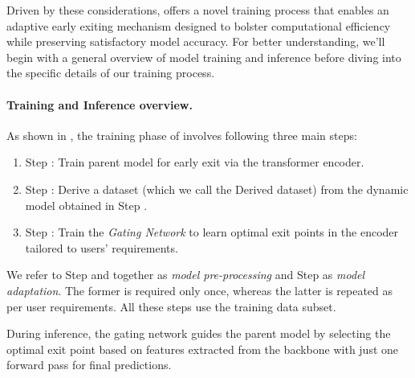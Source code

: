 Driven by these considerations, {\ours} offers a novel training process that enables an adaptive early exiting mechanism designed to bolster computational efficiency while preserving satisfactory model accuracy. For better understanding, we'll begin with a general overview of model training and inference before diving into the specific details of our training process. 
%

\paragraph{Training and Inference overview.} As shown in , the training phase of {\ours} involves following three main steps: 
\begin{enumerate}[label={$\bullet$}, leftmargin=*]
    \item Step \stepA: Train parent model for early exit via the transformer encoder.
    \item Step \stepB: Derive a dataset (which we call the Derived dataset) from the dynamic model obtained in Step \stepA.
    \item Step \stepC: Train the \textit{Gating Network} to learn optimal exit points in the encoder tailored to users' requirements.
\end{enumerate}
We refer to Step \stepA and \stepB together as \textit{model pre-processing} and Step \stepC as \textit{model adaptation}. The former is required only once, whereas the latter is repeated as per user requirements. All these steps use the training data subset. 

During inference, the gating network guides the parent model by selecting the optimal exit point based on features extracted from the backbone with just one forward pass for final predictions.
%
